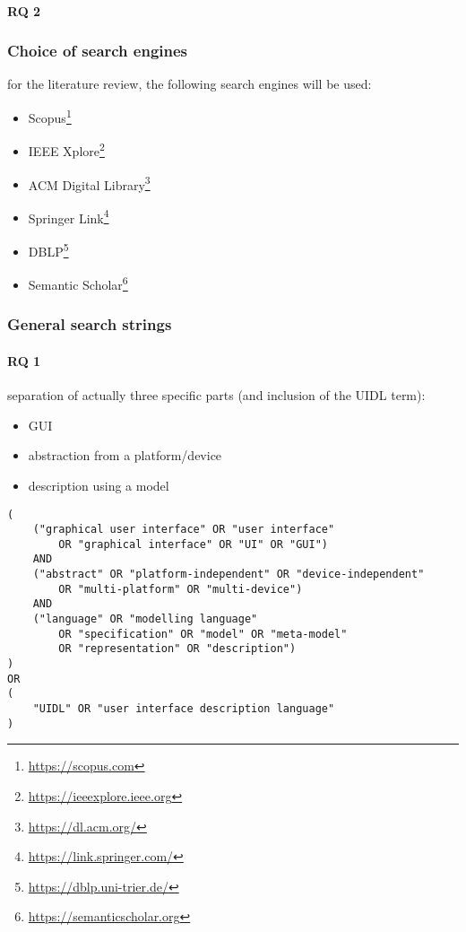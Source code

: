 \paragraph{RQ 2}

\subsubsection{Choice of search engines}
for the literature review, the following search engines will be used:
\begin{itemize}
    \item Scopus\footnote{\url{https://scopus.com}}
    \item IEEE Xplore\footnote{\url{https://ieeexplore.ieee.org}}
    \item ACM Digital Library\footnote{\url{https://dl.acm.org/}}
    \item Springer Link\footnote{\url{https://link.springer.com/}}
    \item DBLP\footnote{\url{https://dblp.uni-trier.de/}}
    \item Semantic Scholar\footnote{\url{https://semanticscholar.org}}
\end{itemize}

\subsubsection{General search strings}

\paragraph{RQ 1}

separation of actually three specific parts (and inclusion of the UIDL term):
\begin{itemize}
    \item GUI
    \item abstraction from a platform/device
    \item description using a model
\end{itemize}

\begin{listing}
    \begin{verbatim}
(
    ("graphical user interface" OR "user interface"
        OR "graphical interface" OR "UI" OR "GUI")
    AND
    ("abstract" OR "platform-independent" OR "device-independent"
        OR "multi-platform" OR "multi-device")
    AND
    ("language" OR "modelling language"
        OR "specification" OR "model" OR "meta-model"
        OR "representation" OR "description")
)
OR
(
    "UIDL" OR "user interface description language"
)
    \end{verbatim}
\end{listing}


